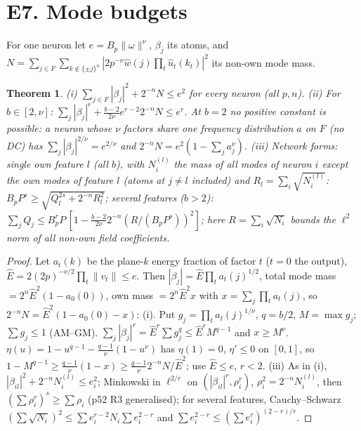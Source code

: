 \documentclass[11pt]{article}
\newtheorem{theorem}{Theorem}\newtheorem{lemma}[theorem]{Lemma}\newtheorem{proposition}[theorem]{Proposition}
\theoremstyle{remark}\newtheorem{remark}[theorem]{Remark}
\begin{document}
\section{E7. Mode budgets}
For one neuron let $e=B_p\|\omega\|^\nu$, $\beta_j$ its atoms, and $N=\sum_{j\in F}\sum_{k\notin\{\pm j\}^n}|2p^{-\nu}\hat w(j)\prod_t\hat u_t(k_t)|^2$ its non-own mode mass.
\begin{theorem}\label{t:mb}
(i) $\sum_{j\in F}|\beta_j|^2+2^{-n}N\le e^2$ for every neuron (all $p,n$).
(ii) For $b\in[2,\nu]$: $\sum_j|\beta_j|^r+\frac{b-2}{2\nu}e^{r-2}2^{-n}N\le e^r$. At $b=2$ no positive constant is possible:
a neuron whose $\nu$ factors share one frequency distribution $a$ on $F$ (no DC) has $\sum_j|\beta_j|^{2/\nu}=e^{2/\nu}$ and $2^{-n}N=e^2(1-\sum_ja_j^\nu)$.
(iii) Network forms: single own feature $l$ (all $b$), with $N^{(l)}_i$ the mass of all modes of neuron $i$ except the own modes of feature $l$ (atoms at $j\neq l$ included) and $R_l=\sum_i\sqrt{N^{(l)}_i}$: $B_pP^s\ge\sqrt{Q_l^{2s}+2^{-n}R_l^2}$; several features ($b>2$):
$\sum_jQ_j\le B_p^rP\,[1-\frac{b-2}{2\nu}2^{-n}(R/(B_pP^s))^2]$; here $R=\sum_i\sqrt{N_i}$ bounds the $\ell^2$ norm of all non-own field coefficients.
\end{theorem}
\begin{proof}
Let $a_t(k)$ be the plane-$k$ energy fraction of factor $t$ ($t=0$ the output), $\hat E=2(2p)^{-\nu/2}\prod_t\|v_t\|\le e$. Then $|\beta_j|=\hat E\prod_ta_t(j)^{1/2}$,
total mode mass $=2^n\hat E^2(1-a_0(0))$, own mass $=2^n\hat E^2x$ with $x=\sum_j\prod_ta_t(j)$, so $2^{-n}N=\hat E^2(1-a_0(0)-x)$: (i).
Put $g_j=\prod_ta_t(j)^{1/\nu}$, $q=b/2$, $M=\max g_j$; $\sum g_j\le1$ (AM--GM). $\sum_j|\beta_j|^r=\hat E^r\sum g_j^q\le\hat E^rM^{q-1}$ and $x\ge M^\nu$.
$\eta(u)=1-u^{q-1}-\frac{q-1}\nu(1-u^\nu)$ has $\eta(1)=0$, $\eta'\le0$ on $[0,1]$, so $1-M^{q-1}\ge\frac{q-1}\nu(1-x)\ge\frac{q-1}\nu2^{-n}N/\hat E^2$; use $\hat E\le e$, $r<2$.
(iii) As in (i), $|\beta_{il}|^2+2^{-n}N^{(l)}_i\le e_i^2$; Minkowski in $\ell^{2/r}$ on $(|\beta_{il}|^r,\rho_i^r)$, $\rho_i^2=2^{-n}N^{(l)}_i$, then $(\sum\rho_i^r)^s\ge\sum\rho_i$ (p52 R3 generalised);
for several features, Cauchy--Schwarz $(\sum\sqrt{N_i})^2\le\sum e_i^{r-2}N_i\sum e_i^{2-r}$ and $\sum e_i^{2-r}\le(\sum e_i^r)^{(2-r)/r}$.
\end{proof}
\end{document}
